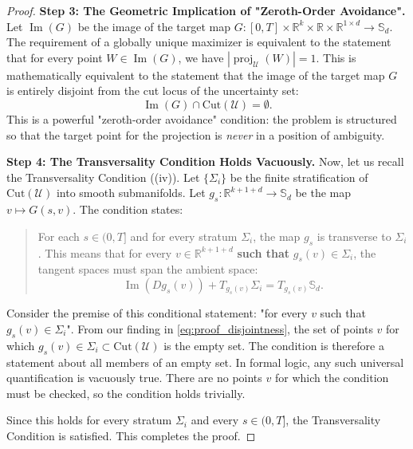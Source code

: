 \documentclass[12pt, letterpaper]{amsart}
\newcommand{\Ucal}{\mathcal{U}}
\DeclareMathOperator{\Image}{Im}
\newcommand{\Sd}{\mathbb{S}_d}
\newcommand{\R}{\mathbb{R}}
\newcommand{\abs}[1]{\left\lvert#1\right\rvert}
\DeclareMathOperator*{\proj}{proj}
\theoremstyle{plain}
\theoremstyle{definition}
\theoremstyle{remark}
\numberwithin{equation}{section} %
\begin{document}
\begin{proof}
\vspace{1ex}
\noindent\textbf{Step 3: The Geometric Implication of "Zeroth-Order Avoidance".}
Let \(\Image(G)\) be the image of the target map \(G: [0,T]\times\R^k\times\R\times\R^{1\times d} \to \Sd\). The requirement of a globally unique maximizer is equivalent to the statement that for every point \(W \in \Image(G)\), we have \(\abs{\proj_{\Ucal}(W)} = 1\).
This is mathematically equivalent to the statement that the image of the target map \(G\) is entirely disjoint from the cut locus of the uncertainty set:
\begin{equation} \label{eq:proof_disjointness}
    \Image(G) \cap \mathrm{Cut}(\Ucal) = \emptyset.
\end{equation}
This is a powerful "zeroth-order avoidance" condition: the problem is structured so that the target point for the projection is \emph{never} in a position of ambiguity.

\vspace{1ex}
\noindent\textbf{Step 4: The Transversality Condition Holds Vacuously.}
Now, let us recall the Transversality Condition ((iv)). Let \(\{\Sigma_i\}\) be the finite stratification of \(\mathrm{Cut}(\Ucal)\) into smooth submanifolds. Let \(g_s: \R^{k+1+d} \to \Sd\) be the map \(v \mapsto G(s,v)\). The condition states:
\begin{quote}
    For each \(s \in (0,T]\) and for every stratum \(\Sigma_i\), the map \(g_s\) is transverse to \(\Sigma_i\). This means that for every \(v \in \R^{k+1+d}\) \textbf{such that} \(g_s(v) \in \Sigma_i\), the tangent spaces must span the ambient space:
    \[ \Image(D g_s(v)) + T_{g_s(v)}\Sigma_i = T_{g_s(v)}\Sd. \]
\end{quote}
Consider the premise of this conditional statement: "for every \(v\) such that \(g_s(v) \in \Sigma_i\)". From our finding in \eqref{eq:proof_disjointness}, the set of points \(v\) for which \(g_s(v) \in \Sigma_i \subset \mathrm{Cut}(\Ucal)\) is the empty set.
The condition is therefore a statement about all members of an empty set. In formal logic, any such universal quantification is vacuously true. There are no points \(v\) for which the condition must be checked, so the condition holds trivially.

Since this holds for every stratum \(\Sigma_i\) and every \(s \in (0,T]\), the Transversality Condition is satisfied. This completes the proof.
\end{proof}
\end{document}
